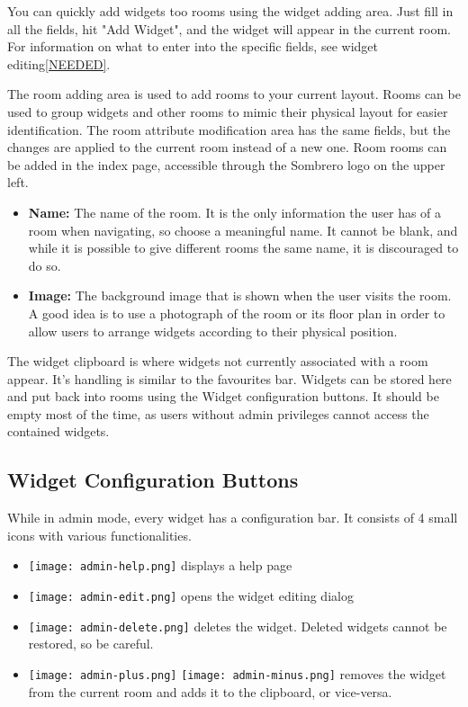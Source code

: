   You can quickly add widgets too rooms using the widget adding area. Just fill in all the fields, hit "Add Widget", and the widget will appear in the current room. For information on what to enter into the specific fields, see widget editing\ref{NEEDED}.

  The room adding area is used to add rooms to your current layout. Rooms can be used to group widgets and other rooms to mimic their physical layout for easier identification. The room attribute modification area has the same fields, but the changes are applied to the current room instead of a new one. Room rooms can be added in the index page, accessible through the Sombrero logo on the upper left.
  \begin{itemize}
    \item \textbf{Name:} The name of the room. It is the only information the user has of a room when navigating, so choose a meaningful name. It cannot be blank, and while it is possible to give different rooms the same name, it is discouraged to do so.
    \item \textbf{Image:} The background image that is shown when the user visits the room. A good idea is to use a photograph of the room or its floor plan in order to allow users to arrange widgets according to their physical position.
  \end{itemize}

  The widget clipboard is where widgets not currently associated with a room appear. It's handling is similar to the favourites bar. Widgets can be stored here and put back into rooms using the Widget configuration buttons. It should be empty most of the time, as users without admin privileges cannot access the contained widgets.

\subsection{Widget Configuration Buttons}

  While in admin mode, every widget has a configuration bar. It consists of 4 small icons with various functionalities.
  \begin{itemize}
    \item \texttt{[image: admin-help.png]} displays a help page
    \item \texttt{[image: admin-edit.png]} opens the widget editing dialog
    \item \texttt{[image: admin-delete.png]} deletes the widget. Deleted widgets cannot be restored, so be careful.
    \item \texttt{[image: admin-plus.png]} \texttt{[image: admin-minus.png]} removes the widget from the current room and adds it to the clipboard, or vice-versa.
  \end{itemize}

